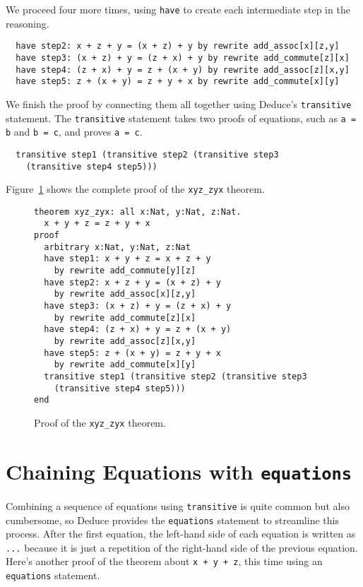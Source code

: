 \documentclass[12pt]{article}
\begin{document}
We proceed four more times, using \texttt{have} to create each
intermediate step in the reasoning.

{\small
\begin{verbatim}
  have step2: x + z + y = (x + z) + y by rewrite add_assoc[x][z,y]
  have step3: (x + z) + y = (z + x) + y by rewrite add_commute[z][x]
  have step4: (z + x) + y = z + (x + y) by rewrite add_assoc[z][x,y]
  have step5: z + (x + y) = z + y + x by rewrite add_commute[x][y]
\end{verbatim}
}

We finish the proof by connecting them all together using Deduce's
\texttt{transitive} statement. The \texttt{transitive} statement takes
two proofs of equations, such as \texttt{a = b} and \texttt{b = c},
and proves \texttt{a = c}.

\begin{verbatim}
  transitive step1 (transitive step2 (transitive step3
    (transitive step4 step5)))
\end{verbatim}

\noindent Figure~\ref{fig:xyz-theorem} shows the complete proof of the
\texttt{xyz\_zyx} theorem.

\begin{figure}[tbp]
\begin{verbatim}
theorem xyz_zyx: all x:Nat, y:Nat, z:Nat.
  x + y + z = z + y + x
proof
  arbitrary x:Nat, y:Nat, z:Nat
  have step1: x + y + z = x + z + y
    by rewrite add_commute[y][z]
  have step2: x + z + y = (x + z) + y
    by rewrite add_assoc[x][z,y]
  have step3: (x + z) + y = (z + x) + y
    by rewrite add_commute[z][x]
  have step4: (z + x) + y = z + (x + y)
    by rewrite add_assoc[z][x,y]
  have step5: z + (x + y) = z + y + x
    by rewrite add_commute[x][y]
  transitive step1 (transitive step2 (transitive step3
    (transitive step4 step5)))
end
\end{verbatim}
\caption{Proof of the \texttt{xyz\_zyx} theorem.}
\label{fig:xyz-theorem}
\end{figure}

\clearpage

\section{Chaining Equations with \texttt{equations}}

Combining a sequence of equations using \texttt{transitive} is quite
common but also cumbersome, so Deduce provides the \texttt{equations}
statement to streamline this process.  After the first equation, the
left-hand side of each equation is written as \texttt{...} because it
is just a repetition of the right-hand side of the previous
equation. Here's another proof of the theorem about \texttt{x + y +
  z}, this time using an \texttt{equations} statement.
\end{document}
